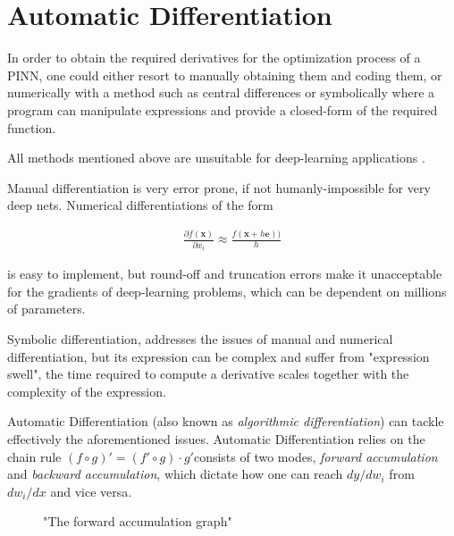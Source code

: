 \section{Automatic Differentiation}

In order to obtain the required derivatives for the optimization process of a PINN, one could either resort to manually obtaining them and coding them, or numerically with a method such as central differences or symbolically where a program can manipulate expressions and provide a closed-form of the required function. ~\cite{Automatic}

All methods mentioned above are unsuitable for deep-learning applications .

Manual differentiation is very error prone, if not humanly-impossible for very deep nets.
Numerical differentiations of the form

\begin{align}
  \frac{\partial f(\mathbf{x})}{\partial x_i} \approx \frac{f(\mathbf{x} + h\mathbf{e}))}{h}
\end{align}

is easy to implement, but round-off and truncation errors make it unacceptable for the gradients of deep-learning problems, which can be dependent on millions of parameters.

Symbolic differentiation, addresses the issues of manual and numerical differentiation, but its expression can be complex and suffer from "expression swell", the time required to compute a derivative scales together with the complexity of the expression.

Automatic Differentiation (also known as \emph{algorithmic differentiation}) can tackle effectively the aforementioned issues.
Automatic Differentiation relies on the chain rule $(f \circ g)' = (f'\circ g)\cdot g'$consists of two modes, \emph{forward accumulation} and \emph{backward accumulation}, which dictate how one can reach $dy/dw_i$ from $dw_i/dx$ and vice versa.

\begin{figure}[!ht]
  \centering
  
  \caption{"The forward accumulation graph"}
\end{figure}
